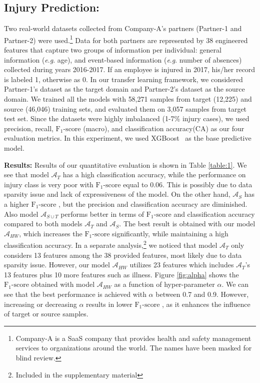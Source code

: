 \documentclass{article}
\newcommand{\eg}{\textit{e}.\textit{g}. }
\newcommand{\FM}{$\text{F}_{1}\text{-score }$}
\begin{document}
\subsection{Injury Prediction:}
\vspace{-.2cm}
Two real-world datasets collected from Company-A's partners (Partner-1 and Partner-2) were used.\footnote{Company-A is a SaaS company that provides health and safety management services to organizations around the world. The names have been masked for blind review.} Data for both partners are represented by 38 engineered features that capture two groups of information per individual: general information (\eg age), and event-based information (\eg number of absences) collected during years 2016-2017. If an employee is injured in 2017, his/her record is labeled 1, otherwise as 0. In our transfer learning framework, we considered Partner-1's dataset as the target domain and Partner-2's dataset as the source domain. We trained all the models with 58,271 samples from target (12,225) and source (46,046) training sets, and evaluated them on 3,057 samples from target test set. Since the datasets were highly imbalanced (1-7\% injury cases), we used precision, recall, \FM (macro), and classification accuracy(CA) as our four evaluation metrics. In this experiment, we used XGBoost~\cite{friedman2001greedy} as the base predictive model.

\textbf{Results:}
Results of our quantitative evaluation is shown in Table \ref{table:1}. We see that model $\mathcal{A}_T$ has a high classification accuracy, while the performance on injury class is very poor with \FM  equal to 0.06. This is possibly due to data sparsity issue and lack of expressiveness of the model. On the other hand, $\mathcal{A}_S$ has a higher \FM, but the precision and classification accuracy are diminished. Also model $\mathcal{A}_{S\cup T}$ performs better in terms of \FM and classification accuracy compared to both models $\mathcal{A}_T$ and $\mathcal{A}_S$. The best result is obtained with our model $\mathcal{A}_{HW}$, which increases the \FM significantly, while maintaining a high classification accuracy. In a separate analysis,\footnote{Included in the supplementary material} we noticed that model $\mathcal{A}_T$ only considers 13 features among the 38 provided features, most likely due to data sparsity issue. However, our model $\mathcal{A}_{HW}$ utilizes 23 features which includes $\mathcal{A}_{T}$'s 13 features plus 10 more features such as illness.
Figure \ref{fig:alpha} shows the $\text{F}_{1}\text{-score}$ obtained with model $\mathcal{A}_{HW}$ as a function of hyper-parameter $\alpha$. We can see that the best performance is achieved with $\alpha$ between 0.7 and 0.9. However, increasing or decreasing $\alpha$ results in lower \FM, as it enhances the influence of target or source samples. 
\end{document}
